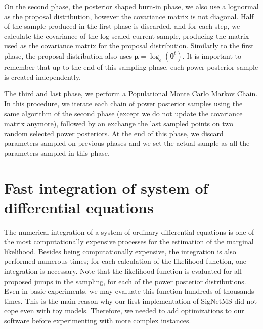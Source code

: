 On the second phase, the posterior shaped burn-in phase, we also use a 
lognormal as the proposal distribution, however the covariance matrix is 
not diagonal. Half of the sample produced in the first phase is
discarded, and for each step, we calculate the covariance of the
log-scaled current sample, producing the matrix used as the covariance
matrix for the proposal distribution. Similarly to the first phase, the
proposal distribution also uses ${\bm \mu} = \log_e({\bm \theta}^t)$. It
is important to remember that up to the end of this sampling phase, each
power posterior sample is created independently.

The third and last phase, we perform a Populational Monte Carlo Markov
Chain. In this procedure, we iterate each chain of power posterior
samples using the same algorithm of the second phase (except we do not
update the covariance matrix anymore), followed by an exchange the last
sampled points on two random selected power posteriors. At the end of
this phase, we discard parameters sampled on previous phases and we set
the actual sample as all the parameters sampled in this phase.

\section{Fast integration of system of differential equations}
%   
The numerical integration of a system of ordinary differential equations
is one of the most computationally expensive processes for the
estimation of the marginal likelihood. Besides being computationally
expensive, the integration is also performed numerous times; for each
calculation of the likelihood function, one integration is necessary.
Note that the likelihood function is evaluated for all proposed jumps in
the sampling, for each of the power posterior distributions. Even in
basic experiments, we may evaluate this function hundreds of thousands
times. This is the main reason why our first implementation of SigNetMS
did not cope even with toy models. Therefore, we needed to add
optimizations to our software before experimenting with more complex
instances.

